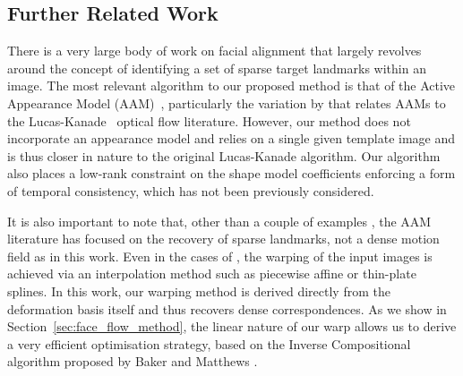 \subsection{Further Related Work}\label{subsec:face_flow_further_related_work}
There is a very large body of work on facial alignment that largely revolves
around the concept of identifying a set of sparse target landmarks within an
image. The most relevant algorithm to our proposed method is that of the
Active Appearance Model (AAM)~\cite{cootes2001active}, particularly the
variation by \citet{matthews2004active} that relates AAMs to the
Lucas-Kanade~\cite{lucas1981iterative,baker2004lucas} optical flow literature.
However, our method does not incorporate an appearance model and relies on a
single given template image and is thus closer in nature to the original
Lucas-Kanade algorithm.
Our algorithm also places a low-rank constraint on the shape model coefficients
enforcing a form of temporal consistency, which has not been previously
considered.

It is also important to note that, other than a couple of examples
\cite{ramnath2008increasing,anderson2014using}, the AAM literature has focused
on the recovery of sparse landmarks, not a dense motion field as in this work.
Even in the cases of \citet{ramnath2008increasing,anderson2014using},
the warping of the input images is achieved via an interpolation method such as
piecewise affine or thin-plate splines. In this work, our warping
method is derived directly from the deformation basis itself and thus recovers
dense correspondences.
As we show in Section~\ref{sec:face_flow_method}, the linear nature of our warp
allows us to derive a very efficient optimisation strategy,
based on the Inverse Compositional algorithm proposed by Baker and Matthews
\cite{baker2004lucas}.

